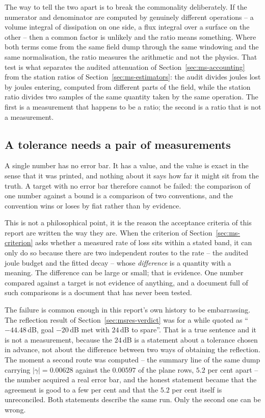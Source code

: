The way to tell the two apart is to break the commonality deliberately. If the numerator and denominator are
computed by genuinely different operations -- a volume integral of dissipation on one side, a flux integral over
a surface on the other -- then a common factor is unlikely and the ratio means something. Where both terms come
from the same field dump through the same windowing and the same normalisation, the ratio measures the
arithmetic and not the physics. That test is what separates the audited attenuation of
Section~\ref{sec:ms-accounting} from the station ratios of Section~\ref{sec:ms-estimators}: the audit divides
joules lost by joules entering, computed from different parts of the field, while the station ratio divides two
samples of the same quantity taken by the same operation. The first is a measurement that happens to be a
ratio; the second is a ratio that is not a measurement.

\subsection{A tolerance needs a pair of measurements}
\label{sec:method-tolerance}

A single number has no error bar. It has a value, and the value is exact in the sense that it was printed, and
nothing about it says how far it might sit from the truth. A target with no error bar therefore cannot be
failed: the comparison of one number against a bound is a comparison of two conventions, and the convention
wins or loses by fiat rather than by evidence.

This is not a philosophical point, it is the reason the acceptance criteria of this report are written the way
they are. When the criterion of Section~\ref{sec:ms-criterion} asks whether a measured rate of loss sits within
a stated band, it can only do so because there are two independent routes to the rate -- the audited joule
budget and the fitted decay -- whose \emph{difference} is a quantity with a meaning. The difference can be
large or small; that is evidence. One number compared against a target is not evidence of anything, and a
document full of such comparisons is a document that has never been tested.

The failure is common enough in this report's own history to be embarrassing. The reflection result of
Section~\ref{sec:msres-verdict} was for a while quoted as ``$-44.48$\,dB, goal $-20$\,dB met with $24$\,dB to
spare''. That is a true sentence and it is not a measurement, because the $24$\,dB is a statement about a
tolerance chosen in advance, not about the difference between two ways of obtaining the reflection. The moment a
second route was computed -- the summary line of the same dump carrying $|\gamma| = 0.00628$ against the
$0.00597$ of the plane rows, $5.2$ per cent apart -- the number acquired a real error bar, and the honest
statement became that the agreement is good to a few per cent and that the $5.2$ per cent itself is
unreconciled. Both statements describe the same run. Only the second one can be wrong.

